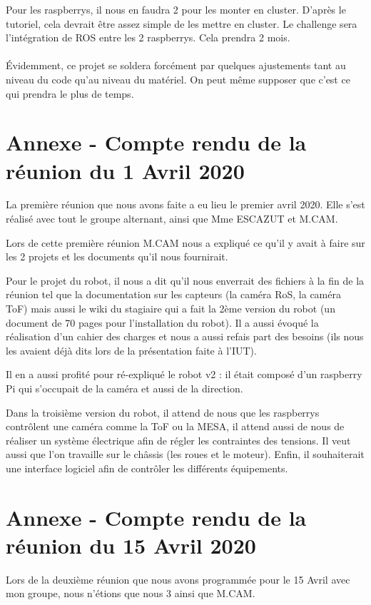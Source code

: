 \documentclass{PackagerQualityN}
\begin{document}
Pour les raspberrys, il nous en faudra 2 pour les monter en cluster. D'après le tutoriel, cela devrait être assez simple de les mettre en cluster. Le challenge sera l'intégration de ROS entre les 2 raspberrys. Cela prendra 2 mois.
\paragraph{}
Évidemment, ce projet se soldera forcément par quelques ajustements tant au niveau du code qu'au niveau du matériel. On peut même supposer que c'est ce qui prendra le plus de temps. 





\newp
\appendix
\section{Annexe - Compte rendu de la réunion du 1 Avril 2020}
La première réunion que nous avons faite a eu lieu le premier avril 2020. Elle s'est réalisé avec tout le groupe alternant, ainsi que Mme ESCAZUT et M.CAM.


Lors de cette première réunion M.CAM nous a expliqué ce qu'il y avait à faire sur les 2 projets et
les documents qu'il nous fournirait.


Pour le projet du robot, il nous a dit qu'il nous enverrait des fichiers à la fin de la réunion tel que la
documentation sur les capteurs (la caméra RoS, la caméra ToF) mais aussi le wiki du stagiaire qui a
fait la 2ème version du robot (un document de 70 pages pour l’installation du robot).
Il a aussi évoqué la réalisation d'un cahier des charges et nous a aussi refais part des besoins (ils
nous les avaient déjà dits lors de la présentation faite à l'IUT).


Il en a aussi profité pour ré-expliqué le robot v2 : il était composé d'un raspberry Pi qui s'occupait
de la caméra et aussi de la direction.


Dans la troisième version du robot, il attend de nous que les raspberrys contrôlent une caméra
comme la ToF ou la MESA, il attend aussi de nous de réaliser un système électrique afin de régler
les contraintes des tensions. Il veut aussi que l'on travaille sur le châssis (les roues et le moteur).
Enfin, il souhaiterait une interface logiciel afin de contrôler les différents équipements.

\newp
\section{Annexe - Compte rendu de la réunion du 15 Avril 2020}
Lors de la deuxième réunion que nous avons programmée pour le 15 Avril avec mon groupe, nous
n'étions que nous 3 ainsi que M.CAM.
\end{document}
